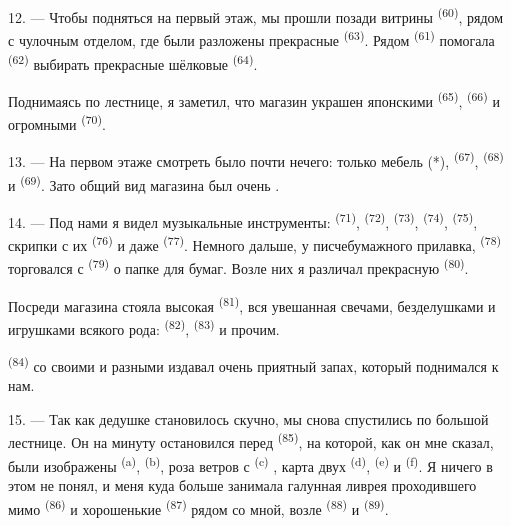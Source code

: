 12. --- Чтобы подняться на первый этаж, мы прошли позади витрины
 \textsuperscript{(60)}, рядом с чулочным отделом, где были
разложены прекрасные  \textsuperscript{(63)}. Рядом
 \textsuperscript{(61)} помогала 
\textsuperscript{(62)} выбирать прекрасные шёлковые  \textsuperscript{(64)}.

Поднимаясь по лестнице, я заметил, что магазин украшен японскими
 \textsuperscript{(65)},  \textsuperscript{(66)} и
огромными  \textsuperscript{(70)}.

13. --- На первом этаже смотреть было почти нечего: только мебель (*),
 \textsuperscript{(67)},  \textsuperscript{(68)}
и  \textsuperscript{(69)}. Зато общий вид магазина был
очень .

14. --- Под нами я видел музыкальные инструменты: 
\textsuperscript{(71)},  \textsuperscript{(72)}, 
\textsuperscript{(73)},  \textsuperscript{(74)}, 
\textsuperscript{(75)}, скрипки с их  \textsuperscript{(76)} и даже
 \textsuperscript{(77)}. Немного дальше, у писчебумажного
прилавка,  \textsuperscript{(78)} торговался с
 \textsuperscript{(79)} о папке для бумаг. Возле них я
различал прекрасную  \textsuperscript{(80)}.

Посреди магазина стояла высокая  \textsuperscript{(81)},
вся увешанная свечами, безделушками и игрушками всякого рода:
 \textsuperscript{(82)}, 
\textsuperscript{(83)} и прочим.

 \textsuperscript{(84)} со своими  и разными  издавал очень приятный запах, который
поднимался к нам.

\VUsaut{3.4mm}
\VUsaut{2.8mm}

15. --- Так как дедушке становилось скучно, мы снова спустились по большой
лестнице. Он на минуту остановился перед 
\textsuperscript{(85)}, на которой, как он мне сказал, были изображены
 \textsuperscript{(a)}, 
\textsuperscript{(b)}, роза ветров с 
\textsuperscript{(c)} , карта двух
 \textsuperscript{(d)},  \textsuperscript{(e)} и
 \textsuperscript{(f)}. Я ничего в этом не понял, и
меня куда больше занимала галунная ливрея проходившего мимо
 \textsuperscript{(86)} и хорошенькие 
\textsuperscript{(87)} рядом со мной, возле  \textsuperscript{(88)} и
 \textsuperscript{(89)}.

